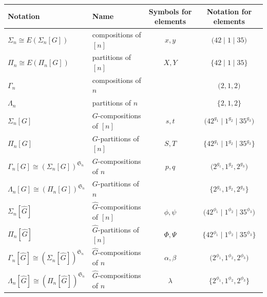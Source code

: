 \documentclass[11pt, oneside, reqno]{amsart}
\theoremstyle{definition}
\numberwithin{equation}{section}
\def \sym{\mathfrak{S}}
\def \wh{\widehat}
\begin{document}
\begin{center}
\begin{tabular}{llcc}
    \toprule
    Notation                                             & Name                           & Symbols for elements & Notation for elements                                        \\
    \midrule
    $\Sigma_n \cong E(\Sigma_n[G])$                      & compositions of $[n]$          & $x,y$                & $\big( 42 \mid 1 \mid 35 \big)$                              \\
    $\Pi_n \cong E(\Pi_n[G])$                            & partitions of $[n]$            & $X,Y$                & $\big\{ 42 \mid 1 \mid 35 \big\}$                            \\
    $\Gamma_n$                                           & compositions of $n$            &                      & $\big( 2 , 1 , 2 \big)$                                      \\
    $\Lambda_n$                                          & partitions of $n$              &                      & $\big\{ 2 , 1 , 2 \big\}$                                    \\
    \midrule
    $\Sigma_n[G]$                                        & $G$-compositions of $[n]$      & $s,t$                & $\big( 42^{g_1} \mid 1^{g_2} \mid 35^{g_3} \big)$            \\
    $\Pi_n[G]$                                           & $G$-partitions of $[n]$        & $S,T$                & $\big\{ 42^{g_1} \mid 1^{g_2} \mid 35^{g_3} \big\}$          \\
    $\Gamma_n[G] \cong (\Sigma_n[G])^{\sym_n}$           & $G$-compositions of $n$        & $p,q$                & $\big( 2^{g_1} , 1^{g_2} , 2^{g_3} \big)$                    \\
    $\Lambda_n[G] \cong (\Pi_n[G])^{\sym_n}$             & $G$-partitions of $n$          &                      & $\big\{ 2^{g_1} , 1^{g_2} , 2^{g_3} \big\}$                  \\
    \midrule
    $\Sigma_n[\wh{G}]$                                   & $\wh{G}$-compositions of $[n]$ & $\phi,\psi$          & $\big( 42^{\phi_1} \mid 1^{\phi_2} \mid 35^{\phi_3} \big)$   \\
    $\Pi_n[\wh{G}]$                                      & $\wh{G}$-partitions of $[n]$   & $\Phi,\Psi$          & $\big\{ 42^{\phi_1} \mid 1^{\phi_2} \mid 35^{\phi_3} \big\}$ \\
    $\Gamma_n[\wh{G}] \cong (\Sigma_n[\wh{G}])^{\sym_n}$ & $\wh{G}$-compositions of $n$   & $\alpha,\beta$       & $\big( 2^{\phi_1} , 1^{\phi_2} , 2^{\phi_3} \big)$           \\
    $\Lambda_n[\wh{G}] \cong (\Pi_n[\wh{G}])^{\sym_n}$   & $\wh{G}$-compositions of $n$   & $\lambda$            & $\big\{ 2^{\phi_1} , 1^{\phi_2} , 2^{\phi_3} \big\}$         \\
    \bottomrule
\end{tabular}
\end{center}
\end{document}

